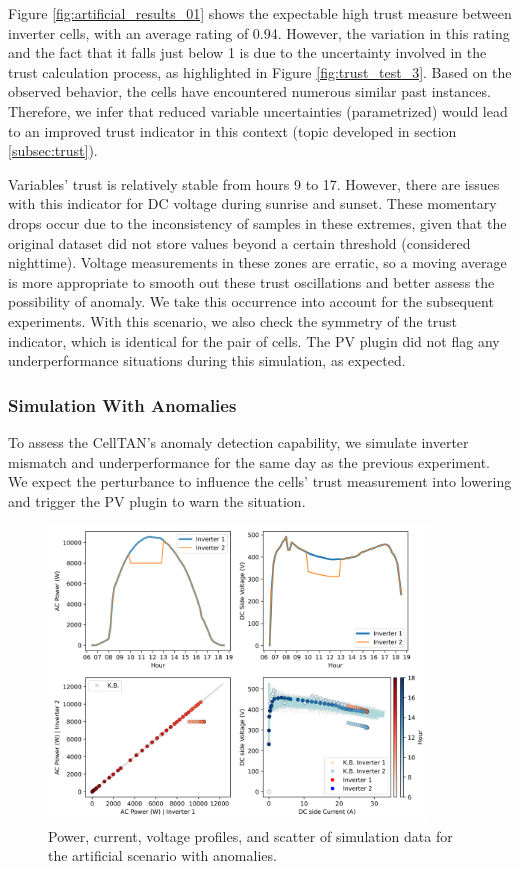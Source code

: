 Figure \ref{fig:artificial_results_01} shows the expectable high trust measure between inverter cells, with an average rating of 0.94. However, the variation in this rating and the fact that it falls just below 1 is due to the uncertainty involved in the trust calculation process, as highlighted in Figure \ref{fig:trust_test_3}. Based on the observed behavior, the cells have encountered numerous similar past instances. Therefore, we infer that reduced variable uncertainties (parametrized) would lead to an improved trust indicator in this context (topic developed in section \ref{subsec:trust}).


Variables' trust is relatively stable from hours 9 to 17. However, there are issues with this indicator for DC voltage during sunrise and sunset. These momentary drops occur due to the inconsistency of samples in these extremes, given that the original dataset did not store values beyond a certain threshold (considered nighttime). Voltage measurements in these zones are erratic, so a moving average is more appropriate to smooth out these trust oscillations and better assess the possibility of anomaly. We take this occurrence into account for the subsequent experiments.
With this scenario, we also check the symmetry of the trust indicator, which is identical for the pair of cells. The PV plugin did not flag any underperformance situations during this simulation, as expected.


\subsubsection{Simulation With Anomalies}

To assess the CellTAN's anomaly detection capability, we simulate inverter mismatch and underperformance for the same day as the previous experiment. We expect the perturbance to influence the cells' trust measurement into lowering and trigger the PV plugin to warn the situation.

\begin{figure}[h!]
    \centering
    \includegraphics[width=0.9\textwidth]{figures/chapter5/results/artificial/41_test_clone_02-1.png}
    \caption{Power, current, voltage profiles, and scatter of simulation data for the artificial scenario with anomalies.}
    \label{fig:artificial_02_piv}
\end{figure}


